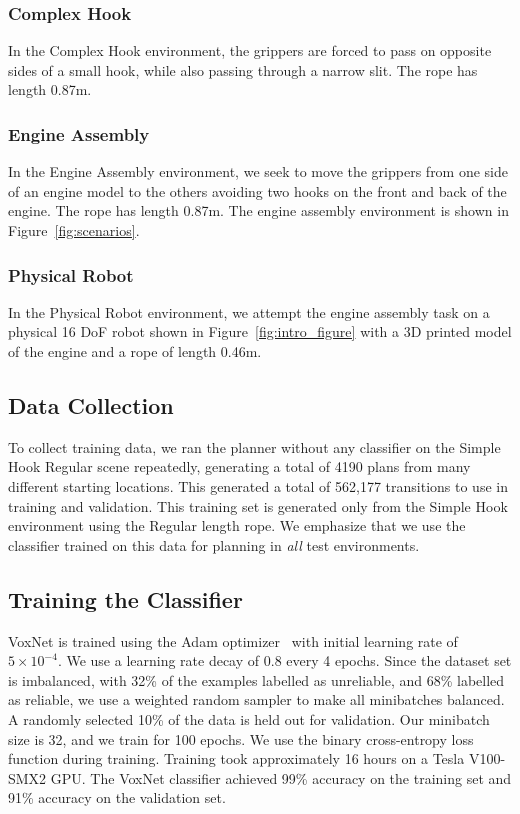 \subsubsection{Complex Hook}

In the Complex Hook environment, the grippers are forced to pass on opposite sides of a small hook, while also passing through a narrow slit. The rope has length 0.87m.


\subsubsection{Engine Assembly}
In the Engine Assembly environment, we seek to move the grippers from one side of an engine model \cite{EngineAssemblyTumber} to the others avoiding two hooks on the front and back of the engine. The rope has length 0.87m.
 The engine assembly environment is shown in Figure~\ref{fig:scenarios}.

\subsubsection{Physical Robot}
In the Physical Robot environment, we attempt the engine assembly task on a physical 16 DoF robot shown in Figure~\ref{fig:intro_figure} with a 3D printed model of the engine and a rope of length 0.46m.


\subsection{Data Collection}

\label{sec:ropedata}
To collect training data, we ran the planner without any classifier on the Simple Hook Regular scene repeatedly, generating a total of 4190 plans from many different starting locations. This generated a total of 562,177 transitions to use in training and validation. This training set is generated only from the Simple Hook environment using the Regular length rope. We emphasize that we use the classifier trained on this data for planning in \textit{all} test environments. %


\subsection{Training the Classifier}

VoxNet is trained using the Adam optimizer~\cite{adamOptimizer2015} with initial learning rate of $5 \times 10^{-4}$. We use a learning rate decay of $0.8$ every 4 epochs. Since the dataset set is imbalanced, with 32\% of the examples labelled as unreliable, and 68\% labelled as reliable, we use a weighted random sampler to make all minibatches balanced. A randomly selected 10\% of the data is held out for validation. Our minibatch size is 32, and we train for 100 epochs. We use the binary cross-entropy loss function during training. Training took approximately 16 hours on a Tesla V100-SMX2 GPU. The VoxNet classifier achieved 99\% accuracy on the training set and 91\% accuracy on the validation set. 




